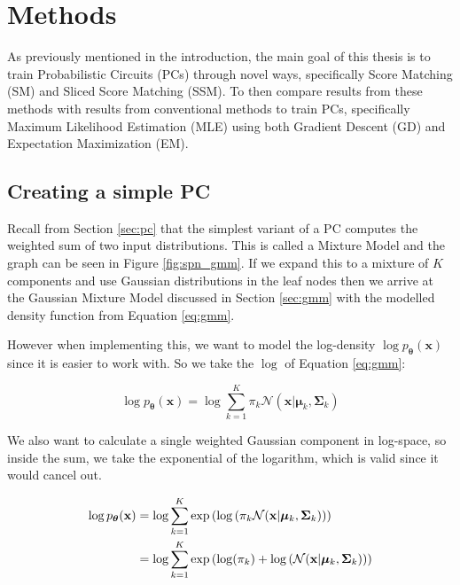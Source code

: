 \renewcommand{\vec}[1]{\textbf{#1}}
\renewcommand{\norm}[1]{\left\lVert#1\right\rVert}

\chapter{Methods}
\label{cha:methods}

As previously mentioned in the introduction, the main goal of this thesis is to train
Probabilistic Circuits (PCs) through novel ways, specifically Score Matching (SM) and Sliced Score Matching (SSM).
To then compare results from these methods with results from conventional methods to train PCs, specifically Maximum Likelihood Estimation (MLE) using both Gradient Descent (GD) and Expectation Maximization (EM). \\

\section{Creating a simple PC}
\label{sec:simple_pc}

Recall from Section \ref{sec:pc} that the simplest variant of a PC computes the weighted sum of two input distributions. This is 
called a Mixture Model and the graph can be seen in Figure \ref{fig:spn_gmm}. If we expand this to a mixture 
of $K$ components and use Gaussian distributions in the leaf nodes then we arrive at the Gaussian Mixture Model 
discussed in Section \ref{sec:gmm} with the modelled density function from Equation \ref{eq:gmm}.

However when implementing this, we want to model the log-density $\log p_{\boldsymbol{\theta}}(\vec x)$ since it is easier to work with. So 
we take the $\log$ of Equation \ref{eq:gmm}:

\begin{equation}
    \log p_{\boldsymbol{\theta}}(\vec x) = \log \sum_{k=1}^K \pi_k \mathcal{N}(\vec x|\boldsymbol{\mu}_k, \boldsymbol{\Sigma}_k) 
    \label{eq:gmm_log}
\end{equation}

We also want to calculate a single weighted Gaussian component in log-space, so inside the sum, we take 
the exponential of the logarithm, which is valid since it would cancel out. 

\begin{align}
    \log p_{\boldsymbol{\theta}}(\vec x) & = \log \sum_{k=1}^K \exp \left( \log \left(\pi_k \mathcal{N}(\vec x|\boldsymbol{\mu}_k, \boldsymbol{\Sigma}_k) \right) \right) \notag \\
    & = \log \sum_{k=1}^K \exp \left( \log (\pi_k) + \log \left( \mathcal{N}(\vec x|\boldsymbol{\mu}_k, \boldsymbol{\Sigma}_k) \right) \right)
    \label{eq:gmm_log2}
\end{align}

